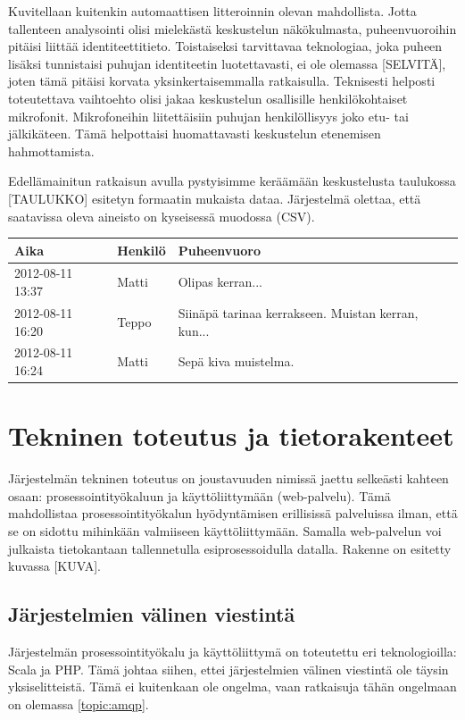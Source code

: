\documentclass[11pt,a4paper,oneside]{memoir}
\begin{document}
Kuvitellaan kuitenkin automaattisen litteroinnin olevan mahdollista. Jotta tallenteen analysointi olisi mielekästä keskustelun näkökulmasta, puheenvuoroihin pitäisi liittää identiteettitieto. Toistaiseksi tarvittavaa teknologiaa, joka puheen lisäksi tunnistaisi puhujan identiteetin luotettavasti, ei ole olemassa [SELVITÄ], joten tämä pitäisi korvata yksinkertaisemmalla ratkaisulla. Teknisesti helposti toteutettava vaihtoehto olisi jakaa keskustelun osallisille henkilökohtaiset mikrofonit. Mikrofoneihin liitettäisiin puhujan henkilöllisyys joko etu- tai jälkikäteen. Tämä helpottaisi huomattavasti keskustelun etenemisen hahmottamista.

Edellämainitun ratkaisun avulla pystyisimme keräämään keskustelusta taulukossa [TAULUKKO] esitetyn formaatin mukaista dataa. Järjestelmä olettaa, että saatavissa oleva aineisto on kyseisessä muodossa (CSV).

\begin{tabular}{| l | l | l |}
\hline
Aika & Henkilö & Puheenvuoro \\ \hline
2012-08-11 13:37 & Matti & Olipas kerran... \\ \hline
2012-08-11 16:20 & Teppo & Siinäpä tarinaa kerrakseen. Muistan kerran, kun... \\ \hline
2012-08-11 16:24 & Matti & Sepä kiva muistelma. \\ \hline
\end{tabular}

\chapter{Tekninen toteutus ja tietorakenteet}
Järjestelmän tekninen toteutus on joustavuuden nimissä jaettu selkeästi kahteen osaan: prosessointityökaluun ja käyttöliittymään (web-palvelu). Tämä mahdollistaa prosessointityökalun hyödyntämisen erillisissä palveluissa ilman, että se on sidottu mihinkään valmiiseen käyttöliittymään. Samalla web-palvelun voi julkaista tietokantaan tallennetulla esiprosessoidulla datalla. Rakenne on esitetty kuvassa [KUVA].

\section{Järjestelmien välinen viestintä}
Järjestelmän prosessointityökalu ja käyttöliittymä on toteutettu eri teknologioilla: Scala ja PHP. Tämä johtaa siihen, ettei järjestelmien välinen viestintä ole täysin yksiselitteistä. Tämä ei kuitenkaan ole ongelma, vaan ratkaisuja tähän ongelmaan on olemassa \vref{topic:amqp}.
\end{document}
